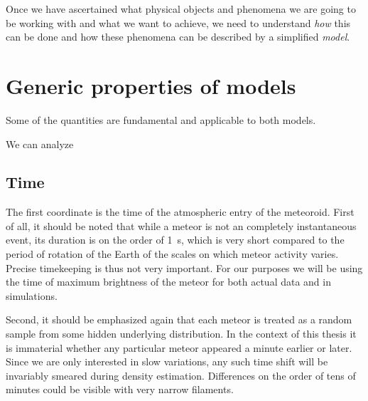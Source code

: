 
Once we have ascertained what physical objects and phenomena we are going to be working with and what we want to achieve,
we need to understand \emph{how} this can be done and how these phenomena can be described by a simplified \emph{model}.


\section{Generic properties of models} \label{mg}
    Some of the quantities are fundamental and applicable to both models.

    We can analyze 

    \subsection{Time} \label{mst}
        The first coordinate is the time of the atmospheric entry of the meteoroid.
        First of all, it should be noted that while a meteor is not an completely instantaneous event,
        its duration is on the order of \SI{1}{\second}, which is very short compared to the
        period of rotation of the Earth of the scales on which meteor activity varies.
        Precise timekeeping is thus not very important.
        For our purposes we will be using the time of maximum brightness
        of the meteor for both actual data and in simulations.

        Second, it should be emphasized again that each meteor is treated
        as a random sample from some hidden underlying distribution.
        In the context of this thesis it is immaterial whether any particular meteor
        appeared a minute earlier or later. Since we are only interested in slow variations,
        any such time shift will be invariably smeared during density estimation.
        Differences on the order of tens of minutes could be visible with very narrow filaments.

